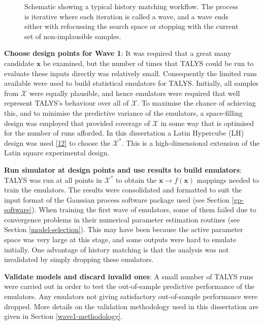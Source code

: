 \documentclass[
  12pt,
  a4paper,
  twoside]{book}
\begin{document}
\begin{figure}[H]
{}

\caption{Schematic showing a typical history matching workflow. The process is iterative where each iteration is called a wave, and a wave ends either with refocussing the search space or stopping with the current set of non-implausible samples.}\label{fig:hm-workflow}
\end{figure}

\textbf{Choose design points for Wave 1}: It was required that a great many candidate \(\mathbf{x}\) be examined, but the number of times that TALYS could be run to evaluate these inputs directly was relatively small. Consequently the limited runs available were used to build statistical emulators for TALYS. Initially, all samples from \(\mathcal{X}\) were equally plausible, and hence emulators were required that well represent TALYS's behaviour over all of \(\mathcal{X}\). To maximise the chance of achieving this, and to minimise the predictive variance of the emulators, a space-filling design was employed that provided coverage of \(\mathcal{X}\) in some way that is optimised for the number of runs afforded. In this dissertation a Latin Hypercube (LH) design was used \protect\hyperlink{ref-lhs_r}{{[}12{]}} to choose the \(\mathcal{X}^*\). This is a high-dimensional extension of the Latin square experimental design.

\textbf{Run simulator at design points and use results to build emulators}: TALYS was run at all points in \(\mathcal{X}^*\) to obtain the \(\mathbf{x}\rightarrow f(\mathbf{x})\) mappings needed to train the emulators. The results were consolidated and formatted to suit the input format of the Gaussian process software package used (see Section \ref{gp-software}). When training the first wave of emulators, some of them failed due to convergence problems in their numerical parameter estimation routines (see Section \ref{model-selection}). This may have been because the active parameter space was very large at this stage, and some outputs were hard to emulate initially. One advantage of history matching is that the analysis was not invalidated by simply dropping these emulators.

\textbf{Validate models and discard invalid ones}: A small number of TALYS runs were carried out in order to test the out-of-sample predictive performance of the emulators. Any emulators not giving satisfactory out-of-sample performance were dropped. More details on the validation methodology used in this dissertation are given in Section \ref{wave1-methodology}.
\end{document}
